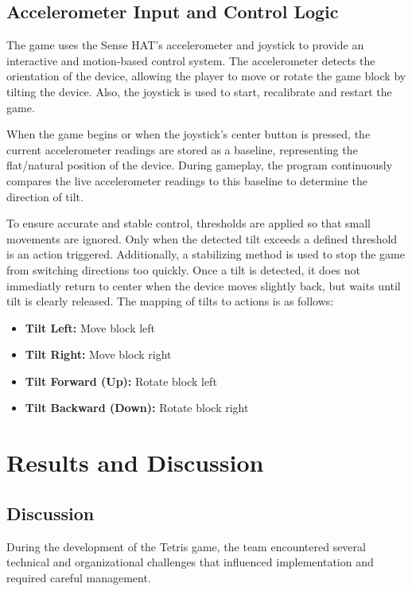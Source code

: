 \documentclass[12pt]{report}
\begin{document}
\section{Accelerometer Input and Control Logic}
The game uses the Sense HAT's accelerometer and joystick to provide an interactive and motion-based control system.
The accelerometer detects the orientation of the device, allowing the player to move or rotate the game block by tilting the device.
Also, the joystick is used to start, recalibrate and restart the game.

When the game begins or when the joystick's center button is pressed, the current accelerometer readings are stored as a baseline, representing the flat/natural position of the device.
During gameplay, the program continuously compares the live accelerometer readings to this baseline to determine the direction of tilt.

To ensure accurate and stable control, thresholds are applied so that small movements are ignored. 
Only when the detected tilt exceeds a defined threshold is an action triggered. 
Additionally, a stabilizing method is used to stop the game from switching directions too quickly.
Once a tilt is detected, it does not immediatly return to center when the device moves slightly back, but waits until tilt is clearly released.
\newline
\newline
The mapping of tilts to actions is as follows:
\begin{itemize}
    \item \textbf{Tilt Left:} Move block left
    \item \textbf{Tilt Right:} Move block right
    \item \textbf{Tilt Forward (Up):} Rotate block left
    \item \textbf{Tilt Backward (Down):} Rotate block right
\end{itemize}

\chapter{Results and Discussion}

\section{Discussion}

During the development of the Tetris game, the team encountered several technical and organizational challenges that influenced implementation and required careful management.
\end{document}
